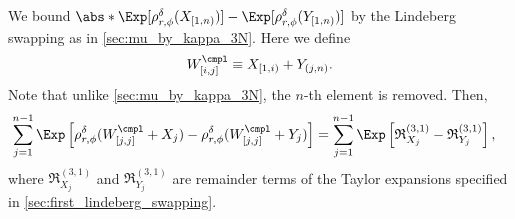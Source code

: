 \documentclass[aos]{imsart}
\begin{document}
\begin{appendix}
\medskip
{} We bound $\abs*{ \Exp[\rho_{r,\phi}^\delta(X_{[1,n)})] - \Exp[\rho_{r,\phi}^\delta(Y_{[1,n)})]}$ by the Lindeberg swapping as in \cref{sec:mu_by_kappa_3N}. Here we define 
\begin{equation*}
    W_{[i,j]}^\cmpl \equiv X_{[1,i)} + Y_{(j,n)}.
\end{equation*}
Note that unlike \cref{sec:mu_by_kappa_3N}, the $n$-th element is removed. Then,
\begin{equation} \label{eq:first_lindeberg_result_3P}
\begin{aligned}
    & \sum_{j=1}^{n-1} \Exp \left[
        \rho_{r,\phi}^\delta(W^\cmpl_{[j,j]} + X_j)
        - \rho_{r,\phi}^\delta(W^\cmpl_{[j,j]} + Y_j) \right] 
    = \sum_{j=1}^{n-1} \Exp \left[ \mathfrak{R}_{X_j}^{(3,1)} 
        - \mathfrak{R}_{Y_j}^{(3,1)} \right],
\end{aligned}
\end{equation}
where $\mathfrak{R}_{X_j}^{(3,1)}$ and $\mathfrak{R}_{Y_j}^{(3,1)}$ are remainder terms of the Taylor expansions specified in \cref{sec:first_lindeberg_swapping}.




\end{appendix}
\end{document}

